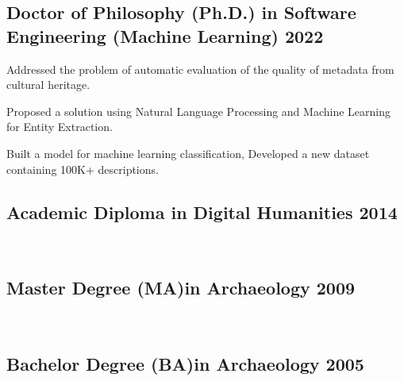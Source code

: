 

\subsection{{Doctor of Philosophy (Ph.D.) in Software Engineering (Machine Learning) \hfill 2022 }}
\begin{zitemize}
\item Addressed the problem of automatic evaluation of the quality of metadata from cultural heritage.
\item Proposed a solution using Natural Language Processing and Machine Learning for Entity Extraction.
\item Built a model for machine learning classification, Developed a new dataset containing 100K+ descriptions.

\end{zitemize}

\subsection{{Academic Diploma in Digital Humanities \hfill 2014 }}
\begin{zitemize}
\\
\end{zitemize}
\subsection{{Master Degree (MA)in Archaeology \hfill 2009 }}
\begin{zitemize}
\\
\end{zitemize}
\subsection{{Bachelor Degree (BA)in Archaeology \hfill 2005 }}
\begin{zitemize}
\\
\end{zitemize}
